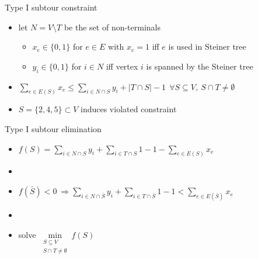 \documentclass[usenames,dvipsnames]{beamer}
\begin{document}
\begin{frame}{Type I subtour constraint}
  \begin{itemize}
  \item let $N = V \setminus T$ be the set of non-terminals
    \begin{itemize}
    \item $x_e \in \{0,1\}$ for $e \in E$ with $x_e = 1$ iff  $e$ is used in Steiner tree
    \item $y_i \in \{0,1\}$ for $i \in N$ iff vertex $i$ is spanned by the Steiner tree
    \end{itemize}
  \item $\sum\limits_{e \in E(S)} x_e \leq \sum\limits_{i \in N \cap S} y_i + |T \cap S| -1~~\forall S \subseteq V,~S \cap T \neq \emptyset$
  \end{itemize}
  \begin{center}
  \end{center}
  \begin{itemize}
  \item $S = \{2,4,5\} \subset V$ induces violated constraint
  \end{itemize}
\end{frame}

\begin{frame}{Type I subtour elimination}
  \begin{itemize}
    \item $f(S) = \sum\limits_{i \in N \cap S} y_i + \sum\limits_{i \in T \cap S} 1 - 1 - \sum\limits_{e \in E(S)} x_e$
    \item[]
    \item $f(\bar{S}) < 0~\Rightarrow \sum\limits_{i \in N \cap
      \bar{S}} y_i + \sum\limits_{i \in T \cap \bar{S}} 1 - 1 <
      \sum\limits_{e \in E(\bar{S})} x_e$
    \item[]
    \item solve $\min\limits_{\substack{S \subseteq V\\S \cap T \neq
        \emptyset}} f(S)$
  \end{itemize}
\end{frame}
\end{document}
